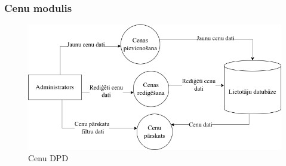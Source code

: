 \subsubsection{Cenu modulis}

\begin{figure}[htbp]
	\centering
	\includegraphics[width=\linewidth]{./src/img/CenuModulis.png}
	\caption{Cenu DPD}
	\label{fig:dpd-2-price}
\end{figure}





